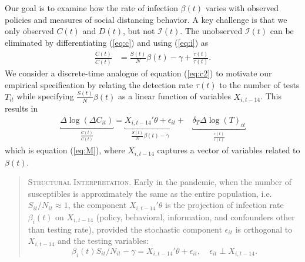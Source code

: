 \documentclass[11pt,reqno,letter]{amsart}
\theoremstyle{definition}
\providecommand{\Infected}{{\mathcal{I}}}
\begin{document}
Our goal is to examine how the rate of infection $\beta(t)$ varies with observed policies
and measures of social distancing behavior. A key challenge is that we only
observed $C(t)$ and $D(t)$, but not $\Infected(t)$. The unobserved $\Infected(t)$ can
be eliminated by differentiating (\ref{eq:c}) and using (\ref{eq:i})  as
\begin{align}
  \frac{\ddot{C}(t)}{\dot{C}(t)}
              & =
                \frac{S(t)}{N} \beta(t) -\gamma  + \frac{\dot{\tau}(t)}{\tau(t)}. \label{eq:c2}
\end{align}
We consider a discrete-time analogue of equation (\ref{eq:c2}) to motivate our empirical
specification by relating the detection rate $\tau(t)$  to the number of tests $T_{it}$ while specifying $\frac{S(t)}{N}\beta(t)$ as a linear function of variables $X_{i,t-14}$.
This results in
\begin{align}
  \underbracket{\Delta \log(\Delta C_{it})}_{\frac{\ddot{C}(t)}{\dot{C}(t)}}
  =
      \underbracket{X_{i,t-14}' \theta + \epsilon_{it}}_{\frac{S(t)}{N}\beta(t) -\gamma}
       +
       & \underbracket{\delta_T \Delta
      \log(T)_{it}}_{\frac{\dot{\tau}(t)}{\tau(t)} } \nonumber
\end{align}
which is equation (\ref{eq:M}), where $X_{i,t-14}$ captures a vector of variables related to $\beta(t)$.

\begin{quote}
\textsc{Structural Interpretation}. Early in the pandemic, when
the number of susceptibles is approximately the same as the entire population, i.e. $S_{it}/N_{it} \approx 1$, the component $X_{i,t-14}' \theta$
is the projection of infection rate $ \beta_i(t)$ on   $X_{i,t-14}$ (policy, behavioral, information, and confounders other than testing rate), provided
the stochastic component $\epsilon_{it}$ is orthogonal
to $X_{i,t-14}$ and the testing variables:
$$
\beta_i(t)S_{it}/N_{it}  - \gamma = X_{i,t-14}' \theta + \epsilon_{it}, \quad \epsilon_{it} \perp X_{i,t-14}.
$$
\end{quote}
\end{document}
